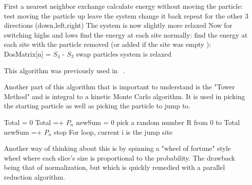 \begin{varwidth}{\dimexpr{}\fboxrule\relax}
\begin{algorithmic}[1]
\State First a nearest neighbor exchange
\State calculate energy without moving the particle:
\State test moving the particle up
\State leave the system
\Else
\State change it back
\EndIf
\State repeat for the other 3 directions (down,left,right)
\EndIf
\EndFor
\State The system is now slightly more relaxed
\State Now for switching highs and lows
\State find the energy at each site normally:
\State find the energy at each site with the particle removed (or added if the site was empty ):
\State DosMatrix[n] = $S_4$ - $S_3$
\EndFor
{}
\State swap particles
\Else
\State system is relaxed
\EndIf
\EndWhile



This algorithm was previously used in ~\cite{glatz08}. 

\end{algorithmic}
\end{varwidth}%

Another part of this algorithm that is important to understand is the "Tower Method" and is integral to a kinetic Monte Carlo algorithm. It is used in picking the starting particle as well as picking the particle to jump to.







\begin{varwidth}{\dimexpr{}\fboxrule\relax}
\begin{algorithmic}[1]
\State Total = 0
\State Total =+ $P_n$
\EndFor
\State newSum = 0
\State pick a random number R from 0 to Total
\State newSum =+ $P_n$
\State stop For loop, current i is the jump site
\EndIf
\EndFor




Another way of thinking about this is by spinning a "wheel of fortune" style wheel where each slice's size is proportional to the probability. The drawback being that of normalization, but which is quickly remedied with a parallel reduction algorithm. 
\end{algorithmic}
\end{varwidth}%

